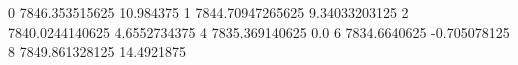 0 7846.353515625 10.984375
1 7844.70947265625 9.34033203125
2 7840.0244140625 4.6552734375
4 7835.369140625 0.0
6 7834.6640625 -0.705078125
8 7849.861328125 14.4921875
